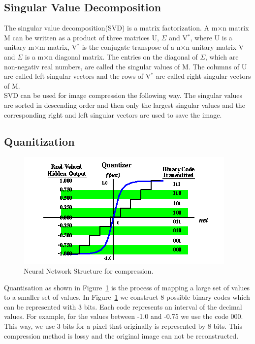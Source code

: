 \documentclass[10pt,conference,compsocconf]{IEEEtran}
\begin{document}
\subsection{Singular Value Decomposition}
The singular value decomposition(SVD) is a matrix factorization. A m$\times$n matrix M can be written as a product of three matrices U, $\Sigma$ and V$^*$, where U is a unitary m$\times$m matrix, V$^*$ is the conjugate transpose of a n$\times$n unitary matrix V and $\Sigma$ is a m$\times$n diagonal matrix. The entries on the diagonal of $\Sigma$, which are non-negativ real numbers, are called the singular values of M. The columns of U are called left singular vectors and the rows of V$^*$ are called right singular vectors of M. \\
SVD can be used for image compression the following way. The singular values are sorted in descending order and then only the largest singular values and the corresponding right and left singular vectors are used to save the image.

\subsection{Quanitization}
\label{sec:quanitization}
\begin{figure}[tbp]
  \centering
  \includegraphics[width=\columnwidth]{bpQuantizer}
  \caption{Neural Network Structure for compression.}
  \label{fig:bpQuantizer}
\end{figure}

Quantisation as shown in Figure~\ref{fig:bpQuantizer} is the process of mapping a large set of values to a smaller set of values. In Figure~\ref{fig:bpQuantizer} we construct 8 possible binary codes which can be represented with 3 bits. Each code represents an interval of the decimal values. For example, for the values between -1.0 and -0.75 we use the code 000. This way, we use 3 bits for a pixel that originally is represented by 8 bits. This compression method is lossy and the original image can not be reconstructed. 
\end{document}
